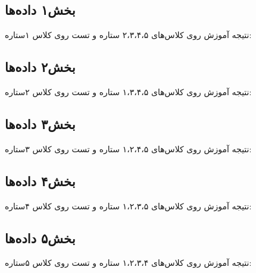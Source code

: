 \Section
{}
{
\subsection{بخش۱ داده‌ها}
{
نتیجه آموزش روی کلاس‌های ۲،۳،۴،۵ ستاره و تست روی کلاس ۱ستاره:

\selectfont \setLR
\begin{adjustbox}{width=\textwidth}
\end{adjustbox}

}
\subsection{بخش۲ داده‌ها}
{
نتیجه آموزش روی کلاس‌های ۱،۳،۴،۵ ستاره و تست روی کلاس ۲ستاره:

\selectfont \setLR
\begin{adjustbox}{width=\textwidth}
\end{adjustbox}

}
\subsection{بخش۳ داده‌ها}
{
نتیجه آموزش روی کلاس‌های ۱،۲،۴،۵ ستاره و تست روی کلاس ۳ستاره:

\selectfont \setLR
\begin{adjustbox}{width=\textwidth}
\end{adjustbox}

}
\subsection{بخش۴ داده‌ها}
{
نتیجه آموزش روی کلاس‌های ۱،۲،۳،۵ ستاره و تست روی کلاس ۴ستاره:

\selectfont \setLR
\begin{adjustbox}{width=\textwidth}
\end{adjustbox}

}
\subsection{بخش۵ داده‌ها}
{
نتیجه آموزش روی کلاس‌های ۱،۲،۳،۴ ستاره و تست روی کلاس ۵ستاره:

\selectfont \setLR
\begin{adjustbox}{width=\textwidth}
\end{adjustbox}

}}
